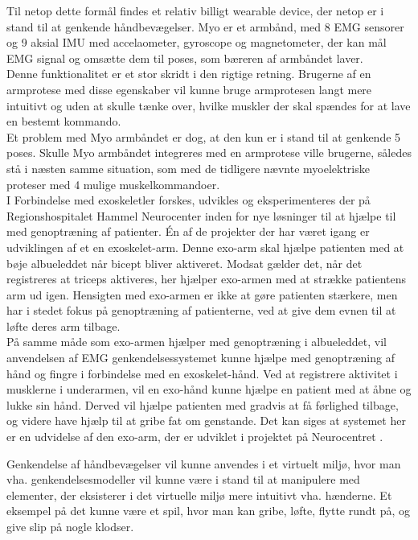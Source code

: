 Til netop dette formål findes et relativ billigt wearable device, der netop er i stand til at genkende håndbevægelser. Myo er et armbånd, med 8 EMG sensorer og 9 aksial IMU med accelaometer, gyroscope og magnetometer, der kan mål EMG signal og omsætte dem til poses, som bæreren af armbåndet laver. \\
Denne funktionalitet er et stor skridt i den rigtige retning. Brugerne af en armprotese med disse egenskaber vil kunne bruge armprotesen langt mere intuitivt og uden at skulle tænke over, hvilke muskler der skal spændes for at lave en bestemt kommando.\\
Et problem med Myo armbåndet er dog, at den kun er i stand til at genkende 5 poses. Skulle Myo armbåndet integreres med en armprotese ville brugerne, således stå i næsten samme situation, som med de tidligere nævnte myoelektriske proteser med 4 mulige muskelkommandoer.\\

I Forbindelse med exoskeletler forskes, udvikles og eksperimenteres der på Regionshospitalet Hammel Neurocenter inden for nye løsninger til at hjælpe til med genoptræning af patienter. Én af de projekter der har været igang er udviklingen af et en exoskelet-arm. Denne exo-arm skal hjælpe patienten med at bøje albueleddet når bicept bliver aktiveret. Modsat gælder det, når det registreres at triceps aktiveres, her hjælper exo-armen med at strække patientens arm ud igen. Hensigten med exo-armen er ikke at gøre patienten stærkere, men har i stedet fokus på genoptræning af patienterne, ved at give dem evnen til at løfte deres arm tilbage.\\

På samme måde som exo-armen hjælper med genoptræning i albueleddet, vil anvendelsen af EMG genkendelsessystemet kunne hjælpe med genoptræning af hånd og fingre i forbindelse med en exoskelet-hånd. Ved at registrere aktivitet i musklerne i underarmen, vil en exo-hånd kunne hjælpe en patient med at åbne og lukke sin hånd. Derved vil hjælpe patienten med gradvis at få førlighed tilbage, og videre have hjælp til at gribe fat om genstande. Det kan siges at systemet her er en udvidelse af den exo-arm, der er udviklet i projektet på Neurocentret \citep{RefWorks:7}.

Genkendelse af håndbevægelser vil kunne anvendes i et virtuelt miljø, hvor man vha.  genkendelsesmodeller vil kunne være i stand til at manipulere med elementer, der eksisterer i det virtuelle miljø mere intuitivt vha. hænderne. Et eksempel på det kunne være et spil, hvor man kan gribe, løfte, flytte rundt på, og give slip på nogle klodser.
